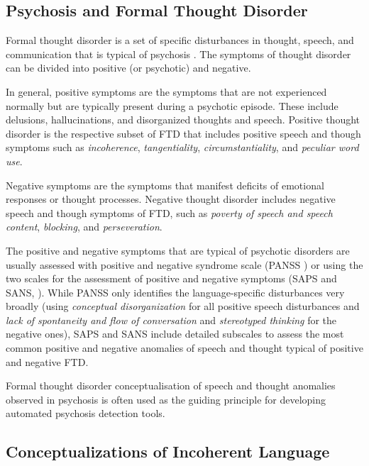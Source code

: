 \subsection{Psychosis and Formal Thought Disorder}

Formal thought disorder is a set of specific disturbances in thought, speech, and communication that is typical of psychosis \citep{hart2017rethinking}. The symptoms of thought disorder can be divided into positive (or psychotic) and negative. 

In general, positive symptoms are the symptoms that are not experienced normally but are typically present during a psychotic episode. These include delusions, hallucinations, and disorganized thoughts and speech. Positive thought disorder is the respective subset of FTD that includes positive speech and though symptoms such as \textit{incoherence}, \textit{tangentiality}, \textit{circumstantiality}, and \textit{peculiar word use}. 

Negative symptoms are the symptoms that manifest deficits of emotional responses or thought processes. Negative thought disorder includes negative speech and though symptoms of FTD, such as \textit{poverty of speech and speech content}, \textit{blocking}, and \textit{perseveration}.

The positive and negative symptoms that are typical of psychotic disorders are usually assessed with positive and negative syndrome scale (PANSS \cite{kay1987positive}) or using the two scales for the assessment of positive and negative symptoms (SAPS and SANS, \cite{andreasen1984saps, andreasen1984sans}). While PANSS only identifies the language-specific disturbances very broadly (using \textit{conceptual disorganization} for all positive speech disturbances and \textit{lack of spontaneity and flow of conversation} and \textit{stereotyped thinking} for the negative ones), SAPS and SANS include detailed subscales to assess the most common positive and negative anomalies of speech and thought typical of positive and negative FTD. 

Formal thought disorder conceptualisation of speech and thought anomalies observed in psychosis is often used as the guiding principle for developing automated psychosis detection tools.  


\subsection{Conceptualizations of Incoherent Language}

